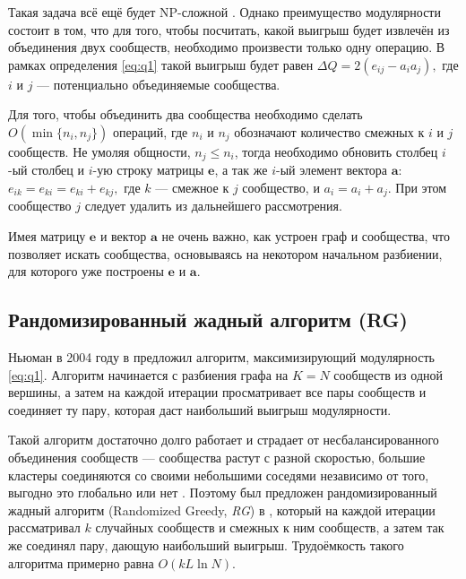 Такая задача всё ещё будет NP-сложной \cite{Brandes&al:2008}. Однако преимущество модулярности состоит в том, что для того, чтобы посчитать, какой выигрыш будет извлечён из объединения двух сообществ, необходимо произвести только одну операцию. В рамках определения \eqref{eq:q1} такой выигрыш будет равен $\Delta Q = 2(e_{ij} - a_i a_j),$ где $i$ и $j$ --- потенциально объединяемые сообщества.

Для того, чтобы объединить два сообщества необходимо сделать $O(\min\{n_i, n_j\})$ операций, где $n_i$ и $n_j$ обозначают количество смежных к $i$ и $j$ сообществ. Не умоляя общности, $n_j \leq n_i$, тогда необходимо обновить столбец $i$-ый столбец и $i$-ую строку матрицы $\mathbf{e}$, а так же $i$-ый элемент вектора $\mathbf{a}$: $e_{ik} = e_{ki} = e_{ki} + e_{kj},$ где $k$ --- смежное к $j$ сообщество, и $a_{i} = a_{i} + a_{j}$. При этом сообщество $j$ следует удалить из дальнейшего рассмотрения.

Имея матрицу $\mathbf{e}$ и вектор $\mathbf{a}$ не очень важно, как устроен граф и сообщества, что позволяет искать сообщества, основываясь на некотором начальном разбиении, для которого уже построены $\mathbf{e}$ и $\mathbf{a}$.



\subsection{Рандомизированный жадный алгоритм (RG)}

Ньюман в 2004 году в \cite{Newman:2004} предложил алгоритм, максимизирующий модулярность \eqref{eq:q1}. Алгоритм начинается с разбиения графа на $K = N$ сообществ из одной вершины, а затем на каждой итерации просматривает все пары сообществ и соединяет ту пару, которая даст наибольший выигрыш модулярности.

Такой алгоритм достаточно долго работает и страдает от несбалансированного объединения сообществ --- сообщества растут с разной скоростью, большие кластеры соединяются со своими небольшими соседями независимо от того, выгодно это глобально или нет \cite{Ovelgoenne&Geyer-Schulz:2012a}. Поэтому был предложен рандомизированный жадный алгоритм (Randomized Greedy, \emph{RG}) в \cite{Ovelgoenne&Geyer-Schulz:2010}, который на каждой итерации рассматривал $k$ случайных сообществ и смежных к ним сообществ, а затем так же соединял пару, дающую наибольший выигрыш. Трудоёмкость такого алгоритма примерно равна $O(kL \ln N)$.


